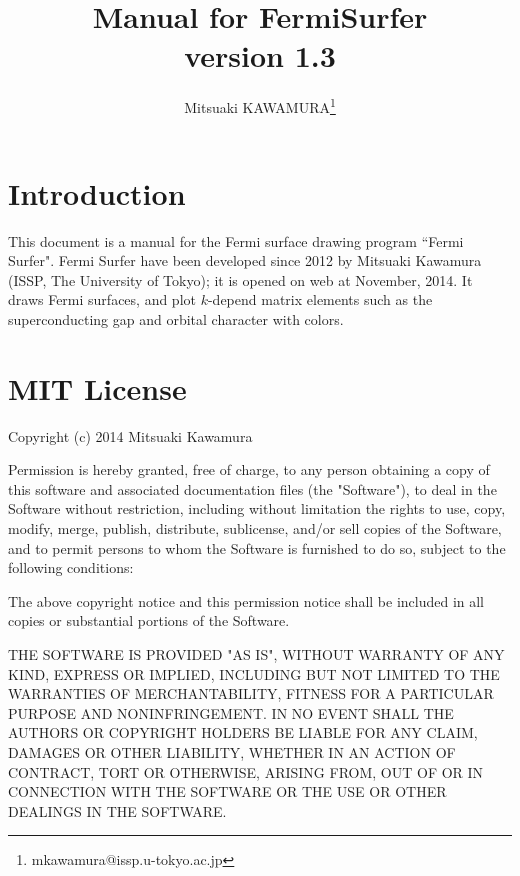 \documentclass[12pt]{article}
\begin{document}
%
%
\title{Manual for FermiSurfer\\
version 1.3}
\author{Mitsuaki KAWAMURA\footnote{mkawamura@issp.u-tokyo.ac.jp}}
\maketitle

\tableofcontents

\section{Introduction}

This document is a manual for the Fermi surface drawing program ``Fermi Surfer".
Fermi Surfer have been  developed since 2012 by Mitsuaki Kawamura
(ISSP, The University of Tokyo); 
it is opened on web at November, 2014.
It draws Fermi surfaces, and 
plot $k$-depend matrix elements such as the superconducting gap and
orbital character with colors.

\section{MIT License}

Copyright (c) 2014 Mitsuaki Kawamura

\vspace{0.5cm}
Permission is hereby granted, free of charge, to any person obtaining a copy
of this software and associated documentation files (the "Software"), to deal
in the Software without restriction, including without limitation the rights
to use, copy, modify, merge, publish, distribute, sublicense, and/or sell
copies of the Software, and to permit persons to whom the Software is
furnished to do so, subject to the following conditions:

\vspace{0.5cm}
The above copyright notice and this permission notice shall be included in
all copies or substantial portions of the Software.

\vspace{0.5cm}
THE SOFTWARE IS PROVIDED "AS IS", WITHOUT WARRANTY OF ANY KIND, EXPRESS OR
IMPLIED, INCLUDING BUT NOT LIMITED TO THE WARRANTIES OF MERCHANTABILITY,
FITNESS FOR A PARTICULAR PURPOSE AND NONINFRINGEMENT. IN NO EVENT SHALL THE
AUTHORS OR COPYRIGHT HOLDERS BE LIABLE FOR ANY CLAIM, DAMAGES OR OTHER
LIABILITY, WHETHER IN AN ACTION OF CONTRACT, TORT OR OTHERWISE, ARISING FROM,
OUT OF OR IN CONNECTION WITH THE SOFTWARE OR THE USE OR OTHER DEALINGS IN
THE SOFTWARE.
\end{document}
